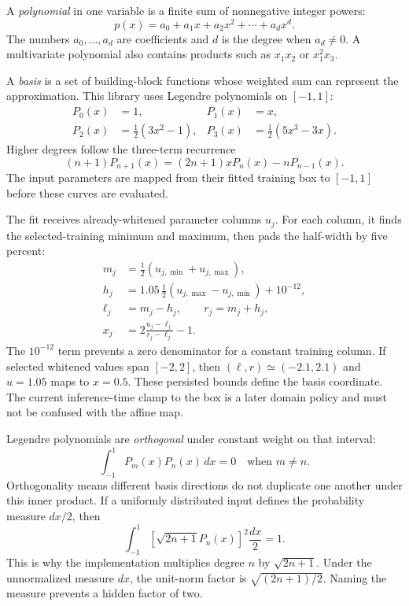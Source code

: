 \documentclass[10pt,aps,prd,twocolumn,nofootinbib]{revtex4-2}
\begin{document}
A \emph{polynomial} in one variable is a finite sum of nonnegative integer
powers:
\begin{equation*}
 p(x)=a_0+a_1x+a_2x^2+\cdots+a_dx^d.
\end{equation*}
The numbers \(a_0,\ldots,a_d\) are coefficients and \(d\) is the degree when
\(a_d\ne0\).  A multivariate polynomial also contains products such as
\(x_1x_2\) or \(x_1^2x_3\).

A \emph{basis} is a set of building-block functions whose weighted sum can
represent the approximation.  This library uses Legendre polynomials on
\([-1,1]\):
\begin{align*}
 P_0(x)&=1,&
 P_1(x)&=x,\\
 P_2(x)&=\tfrac12(3x^2-1),&
 P_3(x)&=\tfrac12(5x^3-3x).
\end{align*}
Higher degrees follow the three-term recurrence
\begin{equation*}
 (n+1)P_{n+1}(x)
 =(2n+1)xP_n(x)-nP_{n-1}(x).
\end{equation*}
The input parameters are mapped from their fitted training box to
\([-1,1]\) before these curves are evaluated.

The fit receives already-whitened parameter columns $u_j$.  For each column,
it finds the selected-training minimum and maximum, then pads the half-width
by five percent:
\begin{align*}
 m_j&=\tfrac12(u_{j,\min}+u_{j,\max}),\\
 h_j&=1.05\,\tfrac12(u_{j,\max}-u_{j,\min})+10^{-12},\\
 \ell_j&=m_j-h_j,\qquad r_j=m_j+h_j,\\
 x_j&=2\frac{u_j-\ell_j}{r_j-\ell_j}-1.
\end{align*}
The $10^{-12}$ term prevents a zero denominator for a constant training
column.  If selected whitened values span $[-2,2]$, then
$(\ell,r)\simeq(-2.1,2.1)$ and $u=1.05$ maps to $x=0.5$.  These persisted
bounds define the basis coordinate.  The current inference-time clamp to the
box is a later domain policy and must not be confused with the affine map.

Legendre polynomials are \emph{orthogonal} under constant weight on that
interval:
\begin{equation*}
 \int_{-1}^{1}P_m(x)P_n(x)\,dx=0
 \quad\text{when }m\ne n.
\end{equation*}
Orthogonality means different basis directions do not duplicate one another
under this inner product.  If a uniformly distributed input defines the
probability measure \(dx/2\), then
\begin{equation*}
 \int_{-1}^{1}
 \left[\sqrt{2n+1}P_n(x)\right]^2\frac{dx}{2}=1.
\end{equation*}
This is why the implementation multiplies degree \(n\) by
\(\sqrt{2n+1}\).  Under the unnormalized measure \(dx\), the unit-norm factor
is \(\sqrt{(2n+1)/2}\).  Naming the measure prevents a hidden
factor of two.
\end{document}
